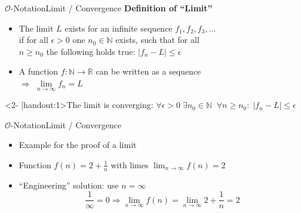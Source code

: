 \begin{frame}{$\mathcal{O}$-Notation}{Limit / Convergence}
  \label{slide:limit}
  \textbf{Definition of \enquote{Limit}}
  \begin{itemize}
    \item
      The {\color{MainA}limit $L$} exists for an infinite sequence
	  $f_1, f_2, f_3, \ldots$\\
      if for all $\epsilon > 0$ one $n_0 \in \mathbb{N}$ exists,
      such that for all\\
      $n \geq n_0$ the following holds true:
      $\left| f_n - L \right| \leq \epsilon$
    \item
      A function $f\!: \mathbb{N} \rightarrow \mathbb{R}$ can be written as a
      sequence\\
      $\Rightarrow$ $\lim\limits_{n \rightarrow \infty} f_n = L$
  \end{itemize}
  \begin{block}<2- |handout:1>{The limit is converging:}
    \begin{math}
      \forall \epsilon > 0 \; \exists n_0 \in \mathbb{N} \;\;
      \forall n \geq n_0 \! : \; \left| f_n - L \right| \leq \epsilon
    \end{math}
  \end{block}
\end{frame}


\begin{frame}{$\mathcal{O}$-Notation}{Limit / Convergence}
  \begin{itemize}
  \item Example for the proof of a limit
  \item Function $f(n) = 2 + \frac{1}{n}$ with limes $\lim_{n \to \infty} f(n) = 2$
  \item \enquote{Engineering} solution: use $n = \infty{}$
    \begin{displaymath}
      \frac{1}{\infty} = 0 \Rightarrow \lim_{n \to \infty} f(n)
        = \lim_{n \to \infty} 2 + \dfrac{1}{n}
        = 2
    \end{displaymath}
  \end{itemize}
\end{frame}


